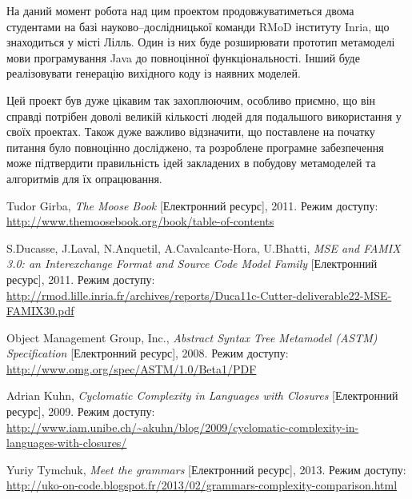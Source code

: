 \documentclass[12pt,a4paper]{article}
\begin{document}
На даний момент робота над цим проектом продовжуватиметься двома студентами на базі науково--дослідницької команди RMoD інституту Inria, що знаходиться у місті Лілль. Один із них буде розширювати прототип метамоделі мови програмування Java до повноцінної функціональності. Інший буде реалізовувати генерацію вихідного коду із наявних моделей.

Цей проект був дуже цікавим так захоплюючим, особливо приємно, що він справді потрібен доволі великій кількості людей для подальшого використання у своїх проектах. Також дуже важливо відзначити, що поставлене на початку питання було повноцінно досліджено, та розроблене програмне забезпечення може підтвердити правильність ідей закладених в побудову метамоделей та алгоритмів для їх опрацювання.

\clearpage

\begin{thebibliography}{9}

Tudor Girba, \emph{The Moose Book} [Електронний ресурс],
    2011. Режим доступу:
    \url{http://www.themoosebook.org/book/table-of-contents}

S.Ducasse, J.Laval, N.Anquetil, A.Cavalcante-Hora, U.Bhatti, \emph{MSE and FAMIX 3.0: an Interexchange Format and Source Code Model Family} [Електронний ресурс], 2011. Режим доступу:
    \url{http://rmod.lille.inria.fr/archives/reports/Duca11c-Cutter-deliverable22-MSE-FAMIX30.pdf}
    
Object Management Group, Inc., \emph{Abstract Syntax Tree Metamodel (ASTM) Specification} [Електронний ресурс], 2008. Режим доступу:
    \url{http://www.omg.org/spec/ASTM/1.0/Beta1/PDF}

Adrian Kuhn, \emph{Cyclomatic Complexity in Languages with Closures} [Електронний ресурс], 2009. Режим доступу:
    \url{http://www.iam.unibe.ch/~akuhn/blog/2009/cyclomatic-complexity-in-languages-with-closures/}

Yuriy Tymchuk, \emph{Meet the grammars} [Електронний ресурс], 2013. Режим доступу:
    \url{http://uko-on-code.blogspot.fr/2013/02/grammars-complexity-comparison.html}

\end{thebibliography}
\end{document}

